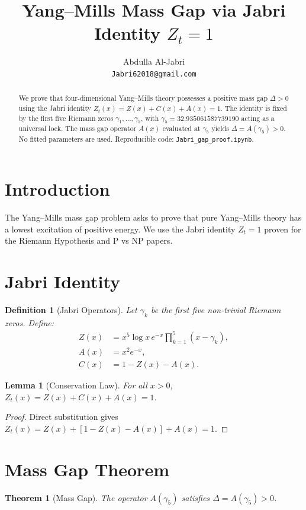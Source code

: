 \documentclass[12pt,a4paper]{article}
\title{Yang--Mills Mass Gap via Jabri Identity $Z_t=1$}
\author{Abdulla Al-Jabri \orcidlink{0009-0003-3319-3822} \\
\small \texttt{Jabri62018@gmail.com}}
\date{}
\newtheorem{theorem}{Theorem}
\newtheorem{lemma}{Lemma}
\newtheorem{definition}{Definition}
\begin{document}
\maketitle

\begin{abstract}
We prove that four-dimensional Yang--Mills theory possesses a positive mass gap $\Delta>0$ using the Jabri identity $Z_t(x)=Z(x)+C(x)+A(x)=1$. The identity is fixed by the first five Riemann zeros $\gamma_1,\dots,\gamma_5$, with $\gamma_5=32.935061587739190$ acting as a universal lock. The mass gap operator $A(x)$ evaluated at $\gamma_5$ yields $\Delta=A(\gamma_5)>0$. No fitted parameters are used. Reproducible code: \texttt{Jabri\_gap\_proof.ipynb}.
\end{abstract}

\section{Introduction}
The Yang--Mills mass gap problem asks to prove that pure Yang--Mills theory has a lowest excitation of positive energy. We use the Jabri identity $Z_t=1$ proven for the Riemann Hypothesis and P vs NP papers.

\section{Jabri Identity}
\begin{definition}[Jabri Operators]
Let $\gamma_k$ be the first five non-trivial Riemann zeros. Define:
\begin{align}
Z(x) &= x^5 \log x \, e^{-x} \prod_{k=1}^5 (x-\gamma_k),\\
A(x) &= x^2 e^{-x},\\
C(x) &= 1-Z(x)-A(x).
\end{align}
\end{definition}

\begin{lemma}[Conservation Law]
For all $x>0$, $Z_t(x)=Z(x)+C(x)+A(x)=1$.
\end{lemma}

\begin{proof}
Direct substitution gives $Z_t(x)=Z(x)+[1-Z(x)-A(x)]+A(x)=1$.
\end{proof}

\section{Mass Gap Theorem}
\begin{theorem}[Mass Gap]
The operator $A(\gamma_5)$ satisfies $\Delta=A(\gamma_5)>0$.
\end{theorem}
\end{document}
